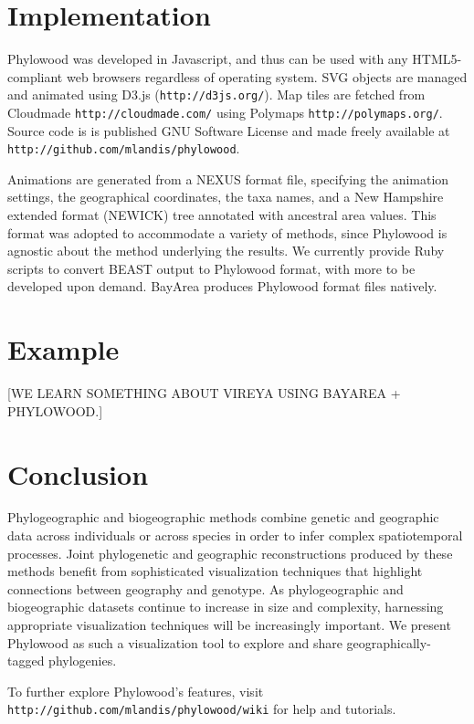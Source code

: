 \documentclass[11pt]{article}
\begin{document}
\section{Implementation}

Phylowood was developed in Javascript, and thus can be used with any HTML5-compliant web browsers regardless of operating system. SVG objects are managed and animated using D3.js (\texttt{http://d3js.org/}). Map tiles are fetched from Cloudmade \texttt{http://cloudmade.com/} using Polymaps \texttt{http://polymaps.org/}. Source code is is published GNU Software License and made freely available at \texttt{http://github.com/mlandis/phylowood}.

Animations are generated from a NEXUS format file, specifying the animation settings, the geographical coordinates, the taxa names, and a New Hampshire extended format (NEWICK) tree annotated with ancestral area values. This format was adopted to accommodate a variety of methods, since Phylowood is agnostic about the method underlying the results. We currently provide Ruby scripts to convert BEAST output to Phylowood format, with more to be developed upon demand. BayArea produces Phylowood format files natively.

\section{Example}

[WE LEARN SOMETHING ABOUT VIREYA USING BAYAREA + PHYLOWOOD.]

\section{Conclusion}

Phylogeographic and biogeographic methods combine genetic and geographic data across individuals or across species in order to infer complex spatiotemporal processes. Joint phylogenetic and geographic reconstructions produced by these methods benefit from sophisticated visualization techniques that highlight connections between geography and genotype. As phylogeographic and biogeographic datasets continue to increase in size and complexity, harnessing appropriate visualization techniques will be increasingly important. We present Phylowood as such a visualization tool to explore and share geographically-tagged phylogenies. 

To further explore Phylowood's features, visit \texttt{http://github.com/mlandis/phylowood/wiki} for help and tutorials.
\end{document}

